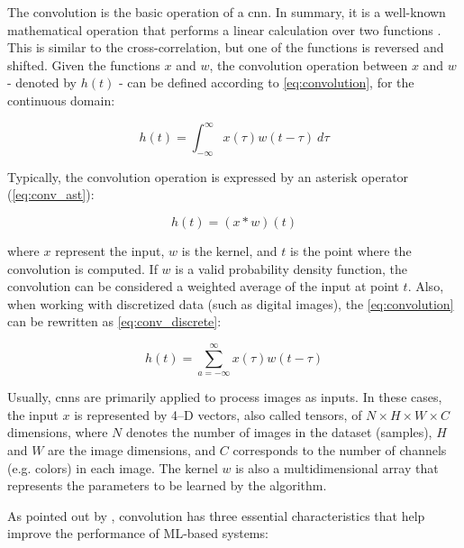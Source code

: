 The convolution is the basic operation of a \acs{cnn}. In summary, it is a well-known mathematical operation that performs a linear calculation over two functions \citep{goodfellow2016deep}. This is similar to the cross-correlation, but one of the functions is reversed and shifted. Given the functions $x$ and $w$, the convolution operation between $x$ and $w$ - denoted by $h(t)$ - can be defined according to \autoref{eq:convolution}, for the continuous domain:

\begin{equation}
\label{eq:convolution}
h(t) = \int_{-\infty }^{\infty} x(\tau)w(t - \tau)\ d\tau
\end{equation}

\noindent
Typically, the convolution operation is expressed by an asterisk operator (\autoref{eq:conv_ast}):

\begin{equation}
\label{eq:conv_ast}
h(t) = (x * w)(t)
\end{equation}

\noindent
where $x$ represent the input, $w$ is the kernel, and $t$ is the point where the convolution is computed. If $w$ is a valid probability density function, the convolution can be considered a weighted average of the input at point $t$. Also, when working with discretized data (such as digital images), the \autoref{eq:convolution} can be rewritten as \autoref{eq:conv_discrete}:

\begin{equation}
\label{eq:conv_discrete}
h(t) = \sum_{a=-\infty}^{\infty} x(\tau)w(t - \tau)
\end{equation}

Usually, \acsp{cnn} are primarily applied to process images as inputs. In these cases, the input $x$ is represented by 4--D vectors, also called tensors, of $N \times H \times W \times C$ dimensions, where $N$ denotes the number of images in the dataset (samples), $H$ and $W$ are the image dimensions, and $C$ corresponds to the number of channels (e.g. colors) in each image. The kernel $w$ is also a multidimensional array that represents the parameters to be learned by the algorithm.

As pointed out by \cite{goodfellow2016deep}, convolution has three essential characteristics that help improve the performance of ML-based systems:


